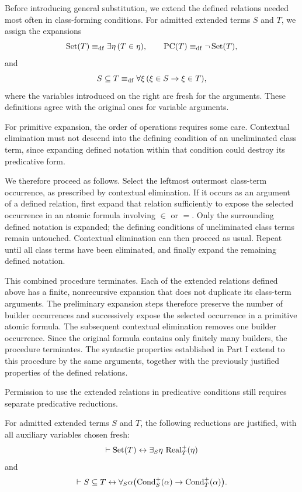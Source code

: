 
Before introducing general substitution, we extend the defined
relations needed most often in class-forming conditions. For admitted
extended terms \(S\) and \(T\), we assign the expansions
\[
\operatorname{Set}(T)\mathrel{\equiv_{\mathrm{df}}}\exists\eta\,(T\in\eta),
\qquad
\operatorname{PC}(T)\mathrel{\equiv_{\mathrm{df}}}\neg\operatorname{Set}(T),
\]
and
\[
S\subseteq T
\mathrel{\equiv_{\mathrm{df}}}
\forall\xi\,(\xi\in S\to\xi\in T),
\]
where the variables introduced on the right are fresh for the
arguments. These definitions agree with the original ones for
variable arguments.

For primitive expansion, the order of operations requires
some care. Contextual elimination must not descend into
the defining condition of an uneliminated class term,
since expanding defined notation within that condition
could destroy its predicative form.

We therefore proceed as follows. Select the leftmost
outermost class-term occurrence, as prescribed by
contextual elimination. If it occurs as an argument
of a defined relation, first expand that relation
sufficiently to expose the selected occurrence in
an atomic formula involving \(\in\) or \(=\).
Only the surrounding defined notation is expanded;
the defining conditions of uneliminated class terms
remain untouched. Contextual elimination can then
proceed as usual. Repeat until all class terms have
been eliminated, and finally expand the remaining
defined notation.

This combined procedure terminates. Each of the
extended relations defined above has a finite,
nonrecursive expansion that does not duplicate
its class-term arguments. The preliminary expansion
steps therefore preserve the number of builder
occurrences and successively expose the selected
occurrence in a primitive atomic formula. The
subsequent contextual elimination removes one
builder occurrence. Since the original formula
contains only finitely many builders, the procedure
terminates. The syntactic properties established
in Part I extend to this procedure by the same
arguments, together with the previously justified
properties of the defined relations.

Permission to use the extended relations in
predicative conditions still requires separate
predicative reductions.

\begin{metatheorem}
\label{meta:predicative-reduction-of-term-relations}
For admitted extended terms \(S\) and \(T\), the following
reductions are justified, with all auxiliary variables chosen fresh:
\[
\vdash
\operatorname{Set}(T)
\leftrightarrow
\exists_S\eta\,\operatorname{Real}^+_T(\eta)
\]
and
\[
\vdash
S\subseteq T
\leftrightarrow
\forall_S\alpha
\bigl(\operatorname{Cond}_S^{+}(\alpha)\to \operatorname{Cond}_T^{+}(\alpha)\bigr).
\]
\end{metatheorem}

